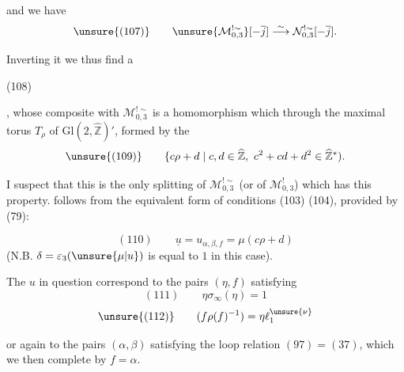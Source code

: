 
and we have
\[
 \unsure{(107)}\qquad
 \unsure{\mathcal M_{0,3}^{!\sim}}[-\overline{j}]
 \overset{\sim}{\longrightarrow}
 \mathcal N_{0,3}^{!\sim}[-\overline{j}].
\]

Inverting it we thus find a

\begin{samepage}
(108)
\end{samepage}
,
whose composite with $\mathcal M_{0,3}^{!\sim}$ is a homomorphism which
through the maximal torus $T_\rho$ of $\mathrm{Gl}(2,\widehat{\mathbb Z})'$,
formed by the
\[
 \unsure{(109)}\qquad
 \{c\rho+d\mid c,d\in\widehat{\mathbb Z},\
 c^2+cd+d^2\in\widehat{\mathbb Z}^{*}).
\]

I suspect that this is the only splitting of
$\mathcal M_{0,3}^{!\sim}$
(or  of $\mathcal M_{0,3}^{!}$)
which has this property.  follows from the equivalent form
of conditions (103) (104), provided by (79):



\[
 (110)\qquad
 \underline{u}=u_{\alpha,\beta,f}=\mu(c\rho+d)
\]
(N.B. $\delta=\varepsilon_3(\unsure{\mu|u})$ is equal to $1$ in this case).

The $u$ in question correspond to the pairs $(\eta,f)$ satisfying
\[
 (111)\qquad \eta\sigma_\infty(\eta)=1
\]
\[
 \unsure{(112)}\qquad
 (f\rho(f)^{-1})=\eta\ell_1^{\unsure{\nu}}
\]



or again to the pairs $(\alpha,\beta)$ satisfying the loop relation
$(97)=(37)$, which we then complete by $f=\alpha$.

